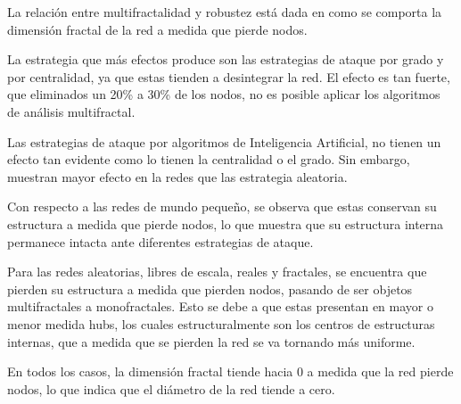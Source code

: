 La relación entre multifractalidad y robustez está dada en como se comporta la dimensión fractal de la red a medida que pierde nodos.

La estrategia que más efectos produce son las estrategias de ataque por grado y por centralidad, ya que estas tienden a desintegrar la red. El efecto es tan fuerte, que eliminados un 20\% a 30\% de los nodos, no es posible aplicar los algoritmos de análisis multifractal.

Las estrategias de ataque por algoritmos de Inteligencia Artificial, no tienen un efecto tan evidente como lo tienen la centralidad o el grado. Sin embargo, muestran mayor efecto en la redes que las estrategia aleatoria.

Con respecto a las redes de mundo pequeño, se observa que estas conservan su estructura a medida que pierde nodos, lo que muestra que su estructura interna permanece intacta ante diferentes estrategias de ataque.

Para las redes aleatorias, libres de escala, reales y fractales, se encuentra que pierden su estructura a medida que pierden nodos, pasando de ser objetos multifractales a monofractales. Esto se debe a que estas presentan en mayor o menor medida hubs, los cuales estructuralmente son los centros de estructuras internas, que a medida que se pierden la red se va tornando más uniforme.

En todos los casos, la dimensión fractal tiende hacia 0 a medida que la red pierde nodos, lo que indica que el diámetro de la red tiende a cero.